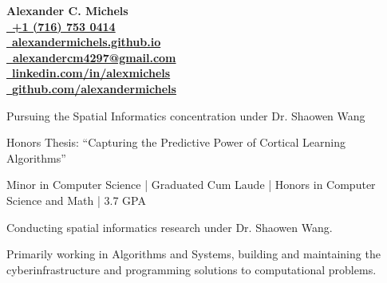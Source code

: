\documentclass{acmresume}
\begin{document}
	
	\begin{multicols}{2}
		\vspace*{.15cm}
		\textbf{\Huge Alexander C. Michels} \\
		\columnbreak
		\hfill\href{tel:17167530414}{\faPhone~\textbf{+1 (716) 753 0414}} \\
		\hfill\href{http://alexandermichels.github.io}{\faGlobeAmericas~\textbf{alexandermichels.github.io}} \\
		\hfill\href{mailto:alexandercm4297@gmail.com}{\textbf{\faEnvelope~alexandercm4297@gmail.com}} \\ \hfill\href{https://www.linkedin.com/in/alexmichels/}{\faLinkedin~\textbf{linkedin.com/in/alexmichels}} \\
		\hfill\href{https://github.com/alexandermichels}{\faGithub~\textbf{github.com/alexandermichels}}
	\end{multicols}
	
	
		\begin{titemize}
			\item{Pursuing the Spatial Informatics concentration under Dr. Shaowen Wang}
		\end{titemize}

		\begin{titemize}
            \item Honors Thesis: ``Capturing the Predictive Power of Cortical Learning Algorithms''
			\item{Minor in Computer Science | Graduated Cum Laude | Honors in Computer Science and Math | 3.7 GPA}
		\end{titemize}
	
	
        \begin{titemize}
            \item Conducting spatial informatics research under Dr. Shaowen Wang.
            \item Primarily working in Algorithms and Systems, building and maintaining the cyberinfrastructure and programming solutions to computational problems.
        \end{titemize}
	
\end{document}
